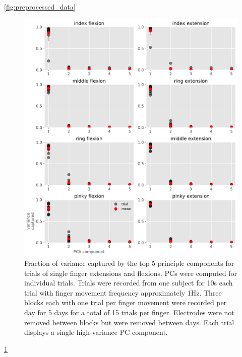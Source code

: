 \documentclass[
  a4paper,
]{article}
\begin{document}
\cref{fig:preprocessed_data}

\begin{figure}
\hypertarget{fig:PCA_variances}{%
\centering
\includegraphics[width=1\textwidth,height=\textheight]{images/data_analysis/fingers/PCA_variances.pdf}
\caption{Fraction of variance captured by the top 5 principle components
for trials of single finger extensions and flexions. PCs were computed
for individual trials. Trials were recorded from one subject for 10s
each trial with finger movement frequency approximately 1Hz. Three
blocks each with one trial per finger movement were recorded per day for
5 days for a total of 15 trials per finger. Electrodes were not removed
between blocks but were removed between days. Each trial displays a
single high-variance PC component.}\label{fig:PCA_variances}
}
\end{figure}

\cref{fig:PCA_variances}
\end{document}
